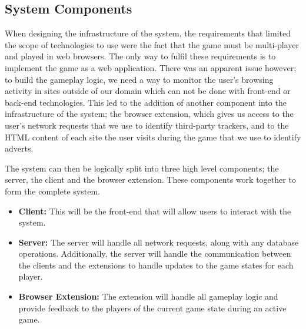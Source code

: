 \documentclass{l4proj}
\begin{document}
\subsection{System Components}
When designing the infrastructure of the system, the requirements that limited the scope of technologies to use were the fact that the game must be multi-player and played in web browsers. The only way to fulfil these requirements is to implement the game as a web application. There was an apparent issue however; to build the gameplay logic, we need a way to monitor the user's browsing activity in sites outside of our domain which can not be done with front-end or back-end technologies. This led to the addition of another component into the infrastructure of the system; the browser extension, which gives us access to the user's network requests that we use to identify third-party trackers, and to the HTML content of each site the user visits during the game that we use to identify adverts.

The system can then be logically split into three high level components; the server, the client and the browser extension. These components work together to form the complete system.
\begin{itemize}
    \item
    \textbf{Client:} This will be the front-end that will allow users to interact with the system.
    \item
    \textbf{Server:} The server will handle all network requests, along with any database operations. Additionally, the server will handle the communication between the clients and the extensions to handle updates to the game states for each player.
    \item
    \textbf{Browser Extension:} The extension will handle all gameplay logic and provide feedback to the players of the current game state during an active game.
\end{itemize}
\end{document}
